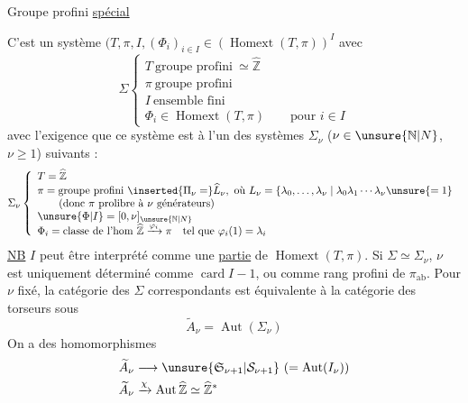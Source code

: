 Groupe profini \uline{spécial}

 C'est un système \inserted{$\Sigma=$}
$(T,\pi,I,(\Phi_i)_{i\in I}\in(\operatorname{Homext}(T,\pi))^I$
avec
\[\Sigma\left\{\begin{array}{l}
T\ \text{groupe profini}\ \simeq\widehat{\mathbb Z}\\
\pi\ \text{groupe profini}\\
I\ \text{ensemble fini}\\
\Phi_i\in\operatorname{Homext}(T,\pi)\qquad\text{pour }i\in I
\end{array}\right.\]
avec l'exigence que ce système est
à l'un des systèmes $\Sigma_\nu$ ($\nu\in\unsure{\mathbb N|N}$, $\nu\ge1$)
suivants :
\[\Sigma_\nu\left\{\begin{array}{l}
T=\widehat{\mathbb Z}\\
\pi=\text{groupe profini}\ \inserted{\Pi_\nu=}\widehat L_\nu,\ \text{où }L_\nu=\left\{\lambda_0,\ldots,\lambda_\nu\mid\lambda_0\lambda_1\cdots\lambda_\nu\unsure{=1}\right.\\
\qquad(\text{donc }\pi\text{ prolibre à }\nu\text{ générateurs})\\
\unsure{\Phi|I}=[0,\nu]_{\unsure{\mathbb N|N}}\\
\Phi_i=\text{classe de l'hom }\widehat{\mathbb Z}\xrightarrow{\varphi_i}\pi\quad\text{tel que }\varphi_i(1)=\lambda_i
\end{array}\right.\]
\uline{NB} $I$ peut être interprété comme une \uline{partie} de $\operatorname{Homext}(T,\pi)$.
Si $\Sigma\simeq\Sigma_\nu$, $\nu$ est uniquement déterminé
comme $\operatorname{card}I-1$, ou 
 comme rang profini de $\pi_{\mathrm{ab}}$.
Pour $\nu$ fixé, la catégorie des $\Sigma$ correspondants
est équivalente à la catégorie des torseurs
sous
\[\widetilde A_\nu=\operatorname{Aut}(\Sigma_\nu)\]
On a des homomorphismes
\[\begin{aligned}
\widetilde A_\nu&\longrightarrow\unsure{\mathfrak S_{\nu+1}|\mathcal S_{\nu+1}}\ (=\operatorname{Aut}(I_\nu))\\
\widetilde A_\nu&\xrightarrow{\chi}\operatorname{Aut}\widehat{\mathbb Z}\simeq\widehat{\mathbb Z}^*
\end{aligned}\]
